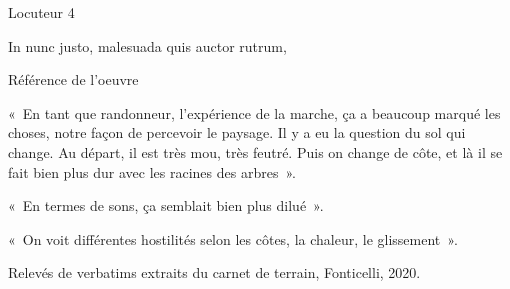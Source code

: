 \documentclass[12pt,twoside,openany]{book}
\newenvironment{lateiDocument}{}{}
\begin{document}
\begin{lateiDocument}
\begin{teiElement}[name={TEI}]
\begin{teiElement}[name={text},xmlid={text-001}]
\begin{teiElement}[name={body},xmlid={body-001}]
\begin{teiDiv}[type={section1},xmlid={section1-009}]
\begin{teiElement}[name={sp}]
					\begin{teiElement}[name={speaker}]
Locuteur 4
\end{teiElement}
					\begin{teiElement}[name={l},n={2}]
 In nunc justo, malesuada quis auctor rutrum,
\end{teiElement}
				
\end{teiElement}
				\begin{teiBibl}[xmlid={bibl-013}]
Référence de l'oeuvre
\end{teiBibl}
			
\end{teiDiv}
			\begin{teiDiv}[type={section1},xmlid={section1-010}]

				\begin{teiElement}[name={floatingText}]

					\begin{teiElement}[name={body},xmlid={body-002}]

						\begin{teiDiv}[type={section1},xmlid={floatingText1div1}]

							\begin{teiDiv}[type={section2},xmlid={floatingText1div2}]

								\begin{teiCit}[xmlid={floatingText1cit1}]

									\begin{teiQuote}
« En tant que randonneur, l’expérience de la marche, ça a beaucoup marqué les
										choses, notre façon de percevoir le paysage. Il y a eu la question du sol qui change. Au
										départ, il est très mou, très feutré. Puis on change de côte, et là il se fait bien plus
										dur avec les racines des arbres ».
\end{teiQuote}
									\begin{teiQuote}
« En termes de sons, ça semblait bien plus dilué ».
\end{teiQuote}
									\begin{teiQuote}
« On voit différentes hostilités selon les côtes, la chaleur, le
										glissement ».
\end{teiQuote}
									\begin{teiBibl}[xmlid={bibl-014}]
Relevés de verbatims extraits du carnet de terrain, Fonticelli, 2020.
\end{teiBibl}
								

\end{teiCit}
\end{teiDiv}
\end{teiDiv}
\end{teiElement}
\end{teiElement}
\end{teiDiv}
\end{teiElement}
\end{teiElement}
\end{teiElement}
\end{lateiDocument}
\end{document}
